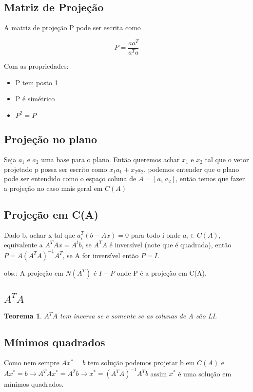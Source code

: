 \documentclass[12pt]{article}
\newtheorem{theorem}{Teorema}
\begin{document}
\subsection*{Matriz de Projeção}
A matriz de projeção P pode ser escrita como

$$P = \dfrac{a a^T}{a^T a}$$

Com as propriedades:
\begin{itemize}
    \item P tem posto 1
    \item P é simétrico
    \item $P^2 = P$
\end{itemize}

\subsection*{Projeção no plano}
Seja $a_1$ e $a_2$ uma base para o plano. Então queremos achar $x_1$ e $x_2$ tal que o vetor projetado p possa ser escrito como $x_1 a_1 + x_2 a_2$, podemos entender que o plano pode ser entendido como o espaço coluna de $A = \left[a_1 \, a_2\right]$, então temos que fazer a projeção no caso mais geral em $C(A)$

\subsection*{Projeção em C(A)}
Dado b, achar x tal que $a_i^T (b - Ax) = 0$ para todo i onde $a_i \in C(A)$, equivalente a $A^T Ax = A^t b$, se $A^T A$ é inversível (note que é quadrada), então $P = A(A^T A)^{-1} A^T$, se A for inversível então $P = I$.

obs.: A projeção em $N(A^T)$ é $I - P$ onde P é a projeção em C(A).

\subsection*{$A^T A$}
\begin{theorem}
$A^T A$ tem inversa se e somente se as colunas de A são LI.
\end{theorem}

\subsection*{Mínimos quadrados}
Como nem sempre $Ax^* = b$ tem solução podemos projetar b em $C(A)$ e $Ax^* = b \xrightarrow{} A^T Ax^* = A^T b \xrightarrow{} x^* = (A^T A)^{-1} A^T b$ assim $x^*$ é uma solução em mínimos quadrados.
\end{document}
